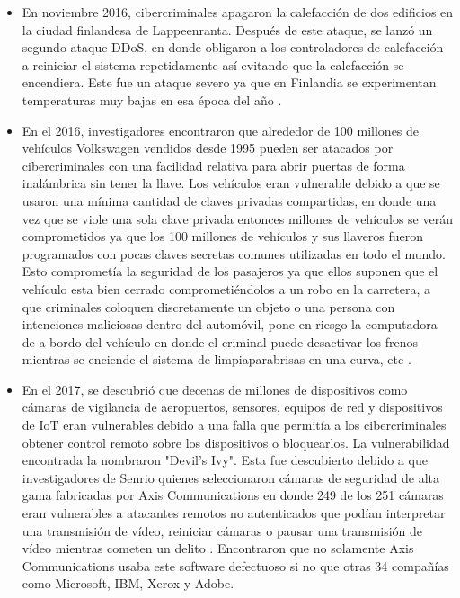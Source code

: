 \documentclass{article}
\begin{document}
            \begin{itemize}
                \item En noviembre 2016, cibercriminales apagaron la calefacción de dos edificios en la ciudad finlandesa de Lappeenranta. Después de este ataque, se lanzó un segundo ataque DDoS, en donde obligaron a los controladores de calefacción a reiniciar el sistema repetidamente así evitando que la calefacción se encendiera. Este fue un ataque severo ya que en Finlandia se experimentan temperaturas muy bajas en esa época del año \cite{husar_2022}.
                \item En el 2016, investigadores encontraron que alrededor de 100 millones de vehículos Volkswagen vendidos desde 1995 pueden ser atacados por cibercriminales con una facilidad relativa para abrir puertas de forma inalámbrica sin tener la llave. Los vehículos eran vulnerable debido a que se usaron una mínima cantidad de claves privadas compartidas, en donde una vez que se viole una sola clave privada entonces millones de vehículos se verán comprometidos ya que los 100 millones de vehículos y sus llaveros fueron programados con pocas claves secretas comunes utilizadas en todo el mundo. Esto comprometía la seguridad de los pasajeros ya que ellos suponen que el vehículo esta bien cerrado comprometiéndolos a un robo en la carretera, a que criminales coloquen discretamente un objeto o una persona con intenciones maliciosas dentro del automóvil, pone en riesgo la computadora de a bordo del vehículo en donde el criminal puede  desactivar los frenos mientras se enciende el sistema de limpiaparabrisas en una curva, etc  \cite{garcia_oswald_kasper_pavlides}.
                \item En el 2017, se descubrió que decenas de millones de dispositivos como cámaras de vigilancia de aeropuertos, sensores, equipos de red y dispositivos de IoT eran vulnerables debido a una falla que permitía a los cibercriminales obtener control remoto sobre los dispositivos o bloquearlos. La vulnerabilidad encontrada la nombraron "Devil's Ivy". Esta fue descubierto debido a que investigadores de Senrio quienes seleccionaron cámaras de seguridad de alta gama fabricadas por Axis Communications en donde 249 de los 251 cámaras eran vulnerables a atacantes remotos no autenticados que podían interpretar una transmisión de vídeo, reiniciar cámaras o pausar una transmisión de vídeo mientras cometen un delito \cite{spring_2019}. Encontraron que no solamente Axis Communications usaba este software defectuoso si no que otras 34 compañías como Microsoft, IBM, Xerox y Adobe.
            \end{itemize}
\end{document}
